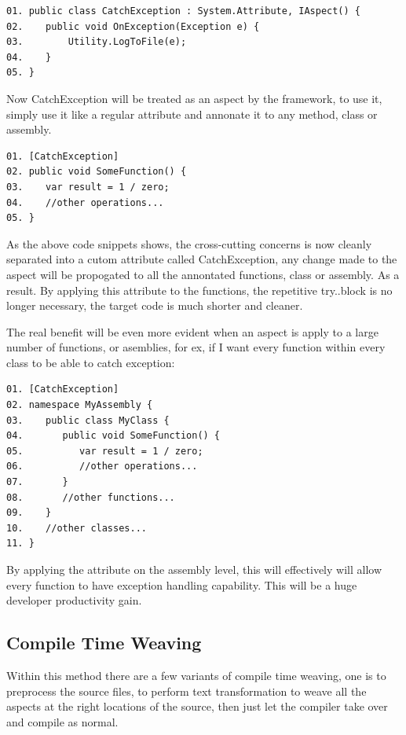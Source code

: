 \begin{verbatim}
01. public class CatchException : System.Attribute, IAspect() {
02.    public void OnException(Exception e) {
03.        Utility.LogToFile(e);
04.    } 
05. }
\end{verbatim}

Now CatchException will be treated as an aspect by the framework, to use it, simply use it like a regular attribute and annonate it to any method, class or assembly.

\begin{verbatim}
01. [CatchException]
02. public void SomeFunction() {
03.    var result = 1 / zero;
04.    //other operations...
05. }
\end{verbatim}

As the above code snippets shows, the cross-cutting concerns is now cleanly separated into a cutom attribute called CatchException, any change made to the aspect will be propogated to all the annontated functions, class or assembly. As a result. By applying this attribute to the functions, the repetitive try..block is no longer necessary, the target code is much shorter and cleaner. 

The real benefit will be even more evident when an aspect is apply to a large number of functions, or asemblies, for ex, if I want every function within every class to be able to catch exception:

\begin{verbatim}
01. [CatchException]
02. namespace MyAssembly {
03.    public class MyClass {
04.       public void SomeFunction() {
05.          var result = 1 / zero;
06.          //other operations...
07.       }
08.       //other functions...
09.    }
10.    //other classes...
11. }
\end{verbatim}

By applying the attribute on the assembly level, this will effectively will allow every function to have exception handling capability. This will be a huge developer productivity gain.


\subsection{Compile Time Weaving}
Within this method there are a few variants of compile time weaving, one is to preprocess the source files, to perform text transformation to weave all the aspects at the right locations of the source, then just let the compiler take over and compile as normal.

